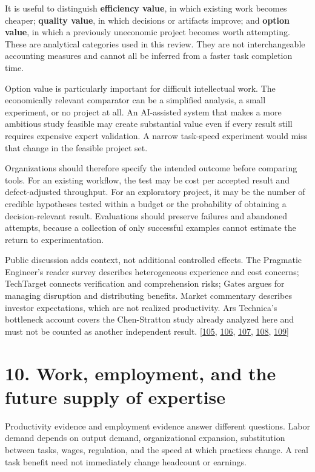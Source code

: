 It is useful to distinguish \textbf{efficiency value}, in which existing work becomes cheaper; \textbf{quality value}, in which decisions or artifacts improve; and \textbf{option value}, in which a previously uneconomic project becomes worth attempting. These are analytical categories used in this review. They are not interchangeable accounting measures and cannot all be inferred from a faster task completion time.


Option value is particularly important for difficult intellectual work. The economically relevant comparator can be a simplified analysis, a small experiment, or no project at all. An AI-assisted system that makes a more ambitious study feasible may create substantial value even if every result still requires expensive expert validation. A narrow task-speed experiment would miss that change in the feasible project set.


Organizations should therefore specify the intended outcome before comparing tools. For an existing workflow, the test may be cost per accepted result and defect-adjusted throughput. For an exploratory project, it may be the number of credible hypotheses tested within a budget or the probability of obtaining a decision-relevant result. Evaluations should preserve failures and abandoned attempts, because a collection of only successful examples cannot estimate the return to experimentation.


Public discussion adds context, not additional controlled effects. The Pragmatic Engineer's reader survey describes heterogeneous experience and cost concerns; TechTarget connects verification and comprehension risks; Gates argues for managing disruption and distributing benefits. Market commentary describes investor expectations, which are not realized productivity. Ars Technica's bottleneck account covers the Chen-Stratton study already analyzed here and must not be counted as another independent result. [\hyperlink{ref-pragmatic2026}{105}, \hyperlink{ref-kompella2026}{106}, \hyperlink{ref-gates2026}{107}, \hyperlink{ref-mukherjee2026}{108}, \hyperlink{ref-orland2026}{109}]



\section*{10. Work, employment, and the future supply of expertise}
Productivity evidence and employment evidence answer different questions. Labor demand depends on output demand, organizational expansion, substitution between tasks, wages, regulation, and the speed at which practices change. A real task benefit need not immediately change headcount or earnings.


